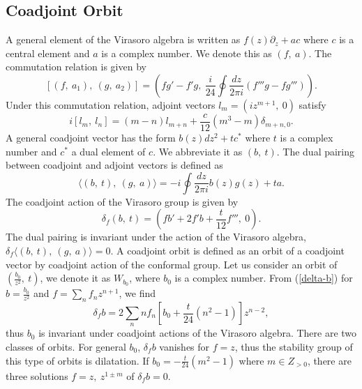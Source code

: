 \documentclass[a4paper,11pt]{article}
\begin{document}
\subsection{Coadjoint Orbit}
A general element of the Virasoro algebra is written as 
$f(z)\partial_z +ac$ where $c$ is a central element 
and $a$ is a complex number. We denote this as $\left(f, \ a\right)$. 
The commutation relation is given by 
\begin{equation}
\left[(f, \ a_1), \ (g, \ a_2)\right]=
  \left(fg'-f'g, \ \frac{i}{24}\oint \frac{dz}{2\pi i}
      \left(f'''g-fg'''\right)\right).
\end{equation}
Under this commutation relation, 
adjoint vectors $l_m=\left(iz^{m+1}, \ 0\right)$ satisfy 
\begin{equation}
i\left[l_m, \ l_n\right]=(m-n)l_{m+n}+\frac{c}{12}(m^3-m)\delta_{m+n,0}.
\end{equation}
A general coadjoint vector has the form $b(z)dz^2+tc^*$ 
where $t$ is a complex number and $c^*$ a dual element of $c$.
We abbreviate it as $\left(b, \ t\right)$.
The dual pairing between coadjoint and adjoint vectors is defined as 
\begin{equation}
 \langle (b,\ t), \ (g, \ a) \rangle =-i\oint\frac{dz}{2\pi i}b(z)g(z)+ta.
\end{equation}
The coadjoint action of the Virasoro group is given by 
\begin{equation}
\label{delta-b}
 \delta_f (b, \ t)=\left(fb'+2f'b+\frac{t}{12}f''', \ 0\right).
\end{equation}
The dual pairing is invariant under the action of the Virasoro algebra, 
$\displaystyle{\delta_f \langle (b,\ t), \ (g, \ a) \rangle=0}$.
A coadjoint orbit is defined as an orbit of a coadjoint vector by 
coadjoint action of the conformal group.
Let us consider an orbit of $\left(\frac{b_0}{z^2}, \ t\right)$, 
we denote it as $W_{b_0}$, where $b_0$ is a complex number.
From (\ref{delta-b}) for $b=\frac{b_0}{z^2}$ and 
$f=\sum_{n}f_n z^{n+1}$, we find 
\begin{equation}
 \delta_f b=2\sum_n n f_n\left[b_0+\frac{t}{24}(n^2-1)\right] z^{n-2},
\end{equation}
thus $b_0$ is invariant under coadjoint actions of the Virasoro algebra.
There are two classes of orbits.
For general $b_0$, $\delta_f b$ vanishes for $f=z$, thus the stability
group of this type of orbits is dilatation. 
If $b_0=-\frac{t}{24}\left(m^2-1\right)$ where $m \in Z_{> 0}$, 
there are three solutions $f=z, \ z^{1\pm m}$ of $\delta_f b=0$.
\end{document}
